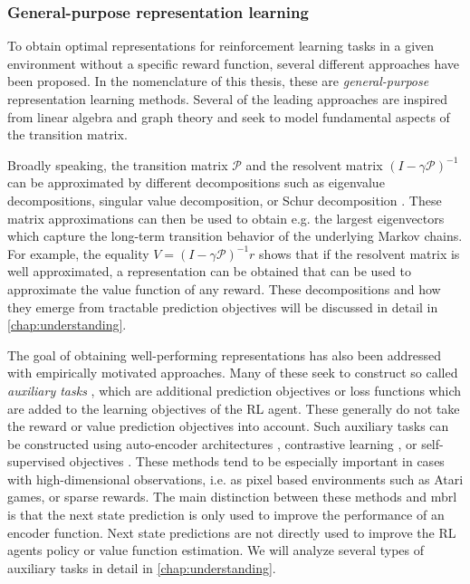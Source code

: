 \subsubsection{General-purpose representation learning}

To obtain optimal representations for reinforcement learning tasks in a given environment without a specific reward function, several different approaches have been proposed.
In the nomenclature of this thesis, these are \emph{general-purpose} representation learning methods.
Several of the leading approaches are inspired from linear algebra and graph theory and seek to model fundamental aspects of the transition matrix.

Broadly speaking, the transition matrix $\mathcal{P}$ and the resolvent matrix $(I - \gamma \mathcal{P})^{-1}$ can be approximated by different decompositions such as eigenvalue decompositions, singular value decomposition, or Schur decomposition \parencite{mahadevan2005proto,mahadevan2007proto,ghosh2020representations}.
These matrix approximations can then be used to obtain e.g. the largest eigenvectors which capture the long-term transition behavior of the underlying Markov chains.
For example, the equality $V = (I - \gamma \mathcal{P})^{-1} r$ shows that if the resolvent matrix is well approximated, a representation can be obtained that can be used to approximate the value function of any reward.
These decompositions and how they emerge from tractable prediction objectives will be discussed in detail in \autoref{chap:understanding}.

The goal of obtaining well-performing representations has also been addressed with empirically motivated approaches.
Many of these seek to construct so called \emph{auxiliary tasks} \parencite{jaderberg2017reinforcement}, which are additional prediction objectives or loss functions which are added to the learning objectives of the RL agent.
These generally do not take the reward or value prediction objectives into account.
Such auxiliary tasks can be constructed using auto-encoder architectures \parencite{jaderberg2017reinforcement}, contrastive learning \parencite{laskin2020contrastive}, or self-supervised objectives \parencite{gelada2019deepmdp,schwarzer2021dataefficient,schwarzer2021pretraining,tang2022understanding}.
These methods tend to be especially important in cases with high-dimensional observations, i.e. as pixel based environments such as Atari games, or sparse rewards.
The main distinction between these methods and \ac{mbrl} is that the next state prediction is only used to improve the performance of an encoder function.
Next state predictions are not directly used to improve the RL agents policy or value function estimation.
We will analyze several types of auxiliary tasks in detail in \autoref{chap:understanding}.

